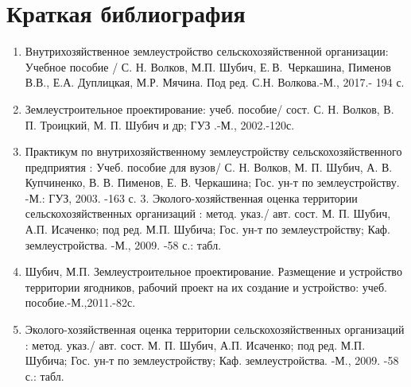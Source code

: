 ﻿\section{Краткая библиография}


\begin{enumerate}
	\item Внутрихозяйственное землеустройство сельскохозяйственной организации: Учебное пособие / С. Н. Волков, М.П. Шубич, Е. В. Черкашина, Пименов В.В., Е.А. Дуплицкая, М.Р. Мячина. Под ред. С.Н. Волкова.-М., 2017.- 194 с.
	\item Землеустроительное проектирование: учеб. пособие/ сост. С. Н. Волков, В. П. Троицкий, М. П. Шубич и др; ГУЗ .-М., 2002.-120с.
	\item Практикум по внутрихозяйственному землеустройству сельскохозяйственного предприятия : Учеб. пособие для вузов/ С. Н. Волков, М. П. Шубич, А. В. Купчиненко, В. В. Пименов, Е. В. Черкашина; Гос. ун-т по землеустройству. -М.: ГУЗ, 2003. -163 с.
3.	Эколого-хозяйственная оценка территории сельскохозяйственных организаций : метод. указ./ авт. сост. М. П. Шубич, А.П. Исаченко; под ред. М.П. Шубича; Гос. ун-т по землеустройству; Каф. землеустройства. -М., 2009. -58 с.: табл.
	\item Шубич, М.П. Землеустроительное проектирование. Размещение и устройство территории ягодников, рабочий проект на их создание и устройство: учеб. пособие.-М.,2011.-82с.
	\item Эколого-хозяйственная оценка территории сельскохозяйственных организаций : метод. указ./ авт. сост. М. П. Шубич, А.П. Исаченко; под ред. М.П. Шубича; Гос. ун-т по землеустройству; Каф. землеустройства. -М., 2009. -58 с.: табл.
\end{enumerate}